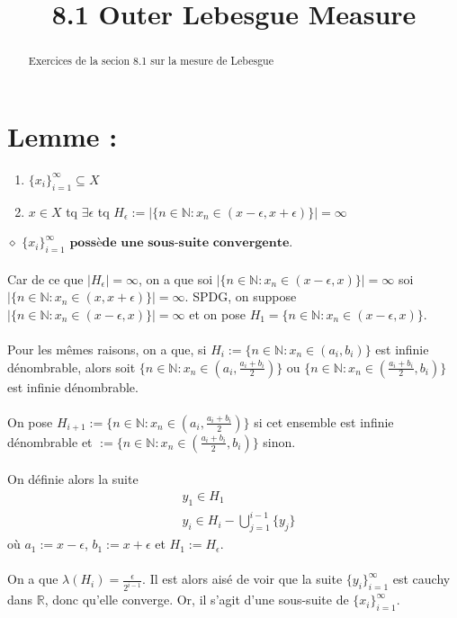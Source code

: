 \documentclass[a4paper,10pt]{article}
\title{8.1 Outer Lebesgue Measure}
\begin{document}
\maketitle

\begin{abstract}
Exercices de la secion 8.1 sur la mesure de Lebesgue
\end{abstract}

\section*{Lemme :}
\begin{enumerate}
  \item $\{x_i\}_{i = 1}^{\infty} \subseteq X$ 
  \item $x \in X $ tq $\exists \epsilon $ tq $H_\epsilon := |\{n \in \mathbb{N} : x_n \in (x - \epsilon, x + \epsilon)\}| = \infty$
\end{enumerate}
$\diamond$ $\{x_i\}_{i=1}^{\infty}$ $\textbf{possède une sous-suite convergente}$. 
\\
\\
Car de ce que $|H_\epsilon| = \infty$, on a que soi $|\{n \in \mathbb{N} : x_n \in (x-\epsilon, x)\}| = \infty$ soi 
$|\{n \in \mathbb{N} : x_n \in (x, x +  \epsilon)\}| = \infty$. SPDG, on suppose $|\{n \in \mathbb{N} : x_n \in (x-\epsilon, x)\}| = \infty$ et on pose 
$H_1 = \{n \in \mathbb{N} : x_n \in (x-\epsilon, x)\}$. 
\\
\\
Pour les mêmes raisons, on a que, si $H_i := \{n \in \mathbb{N} : x_n \in (a_i, b_i)\}$ est infinie dénombrable, alors soit 
$\{n \in \mathbb{N} : x_n \in (a_i, \frac{a_i + b_i}{2})\}$ ou $\{n \in \mathbb{N} : x_n \in (\frac{a_i + b_i}{2}, b_i)\}$ est infinie dénombrable. 
\\
\\
On pose $H_{i+1} := \{n \in \mathbb{N} : x_n \in (a_i, \frac{a_i + b_i}{2})\}$ si cet ensemble est infinie dénombrable et 
$ := \{n \in \mathbb{N} : x_n \in (\frac{a_i + b_i}{2}, b_i)\}$ sinon.
\\
\\
On définie alors la suite
\begin{align*}
 & y_1 \in H_1 \\
 & y_i \in H_i - \bigcup_{j=1}^{i-1} \{y_j\}
\end{align*}
où $a_1 := x - \epsilon$, $b_1 := x + \epsilon$ et $H_1 := H_\epsilon$.
\\
\\
On a que $\lambda(H_i) = \frac{\epsilon}{2^{i-1}}$. Il est alors aisé de voir que la suite $\{y_i\}_{i=1}^\infty$ est cauchy dans $\mathbb{R}$, donc qu'elle converge.
Or, il s'agit d'une sous-suite de $\{x_i\}_{i=1}^\infty$.
\end{document}
